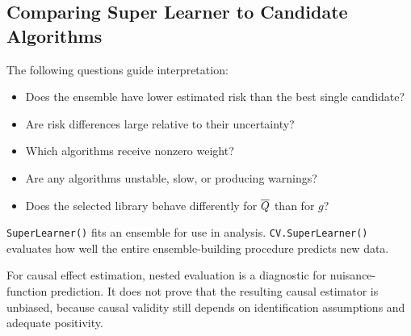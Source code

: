 \subsection{Comparing Super Learner to Candidate Algorithms}

The following questions guide interpretation:
\begin{itemize}
\item Does the ensemble have lower estimated risk than the best single candidate?
\item Are risk differences large relative to their uncertainty?
\item Which algorithms receive nonzero weight?
\item Are any algorithms unstable, slow, or producing warnings?
\item Does the selected library behave differently for $\overline{Q}$ than for $g$?
\end{itemize}

\begin{keyidea}
\texttt{SuperLearner()} fits an ensemble for use in analysis. \texttt{CV.SuperLearner()}
evaluates how well the entire ensemble-building procedure predicts new data.
\end{keyidea}

\begin{estimationbox}
For causal effect estimation, nested evaluation is a diagnostic for nuisance-function
prediction. It does not prove that the resulting causal estimator is unbiased, because
causal validity still depends on identification assumptions and adequate positivity.
\end{estimationbox}
